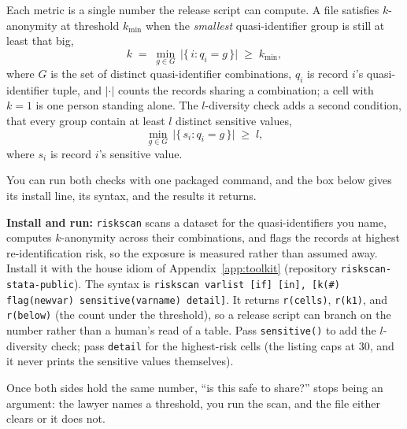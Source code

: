 \documentclass[
    a4paper,
    fontsize=10pt,
    twoside=true,
    numbers=noenddot,
]{kaobook}
\begin{document}
Each metric is a single number the release script can compute. A file satisfies $k$-anonymity at threshold $k_{\min}$ when the \emph{smallest} quasi-identifier group is still at least that big,
\[
  k \;=\; \min_{g \in G}\, \bigl|\{\, i : q_i = g \,\}\bigr| \;\ge\; k_{\min},
\]
where $G$ is the set of distinct quasi-identifier combinations, $q_i$ is record $i$'s quasi-identifier tuple, and $\lvert\cdot\rvert$ counts the records sharing a combination; a cell with $k=1$ is one person standing alone. The $l$-diversity check adds a second condition, that every group contain at least $l$ distinct sensitive values,
\[
  \min_{g \in G}\, \bigl|\{\, s_i : q_i = g \,\}\bigr| \;\ge\; l,
\]
where $s_i$ is record $i$'s sensitive value.

You can run both checks with one packaged command, and the box below gives its install line, its syntax, and the results it returns.

\begin{kaobox}[frametitle=Package Integration: \texttt{riskscan}]
\textbf{Install and run:} \texttt{riskscan} scans a dataset for the quasi-identifiers you name, computes $k$-anonymity across their combinations, and flags the records at highest re-identification risk, so the exposure is measured rather than assumed away. Install it with the house idiom of Appendix~\ref{app:toolkit} (repository \texttt{riskscan-stata-public}).
The syntax is \texttt{riskscan varlist [if] [in], [k(\#) flag(newvar) sensitive(varname) detail]}. It returns \texttt{r(cells)}, \texttt{r(k1)}, and \texttt{r(below)} (the count under the threshold), so a release script can branch on the number rather than a human's read of a table. Pass \texttt{sensitive()} to add the $l$-diversity check; pass \texttt{detail} for the highest-risk cells (the listing caps at 30, and it never prints the sensitive values themselves).
\end{kaobox}

Once both sides hold the same number, \enquote{is this safe to share?} stops being an argument: the lawyer names a threshold, you run the scan, and the file either clears or it does not. 
\end{document}

